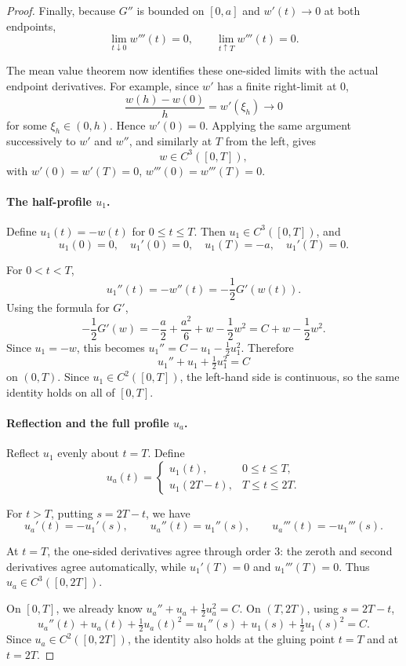 \documentclass{article}
\begin{document}
\begin{proof}
Finally, because $G''$ is bounded on $[0,a]$ and $w'(t) \to 0$ at both endpoints,
\[
\lim_{t \downarrow 0} w'''(t) = 0, \qquad \lim_{t \uparrow T} w'''(t) = 0.
\]

The mean value theorem now identifies these one-sided limits with the actual endpoint derivatives. For example, since $w'$ has a finite right-limit at $0$,
\[
\frac{w(h) - w(0)}{h} = w'(\xi_h) \to 0
\]
for some $\xi_h \in (0,h)$. Hence $w'(0) = 0$. Applying the same argument successively to $w'$ and $w''$, and similarly at $T$ from the left, gives
\[
w \in C^3([0,T]),
\]
with $w'(0) = w'(T) = 0$, $w'''(0) = w'''(T) = 0$.

\paragraph{The half-profile $u_1$.}
Define $u_1(t) = -w(t)$ for $0 \le t \le T$. Then $u_1 \in C^3([0,T])$, and
\[
u_1(0) = 0, \quad u_1'(0) = 0, \quad u_1(T) = -a, \quad u_1'(T) = 0.
\]

For $0 < t < T$,
\[
u_1''(t) = -w''(t) = -\frac{1}{2}G'(w(t)).
\]
Using the formula for $G'$,
\[
-\frac{1}{2}G'(w) = -\frac{a}{2} + \frac{a^2}{6} + w - \frac{1}{2}w^2 = C + w - \frac{1}{2}w^2.
\]
Since $u_1 = -w$, this becomes $u_1'' = C - u_1 - \frac{1}{2}u_1^2$. Therefore
\[
u_1'' + u_1 + \tfrac{1}{2}u_1^2 = C
\]
on $(0,T)$. Since $u_1 \in C^2([0,T])$, the left-hand side is continuous, so the same identity holds on all of $[0,T]$.

\paragraph{Reflection and the full profile $u_a$.}
Reflect $u_1$ evenly about $t = T$. Define
\[
u_a(t) = \begin{cases} u_1(t), & 0 \le t \le T, \\ u_1(2T - t), & T \le t \le 2T. \end{cases}
\]

For $t > T$, putting $s = 2T - t$, we have
\[
u_a'(t) = -u_1'(s), \qquad u_a''(t) = u_1''(s), \qquad u_a'''(t) = -u_1'''(s).
\]

At $t = T$, the one-sided derivatives agree through order 3: the zeroth and second derivatives agree automatically, while $u_1'(T) = 0$ and $u_1'''(T) = 0$. Thus $u_a \in C^3([0,2T])$.

On $[0,T]$, we already know $u_a'' + u_a + \frac{1}{2}u_a^2 = C$. On $(T,2T)$, using $s = 2T - t$,
\[
u_a''(t) + u_a(t) + \tfrac{1}{2}u_a(t)^2 = u_1''(s) + u_1(s) + \tfrac{1}{2}u_1(s)^2 = C.
\]
Since $u_a \in C^2([0,2T])$, the identity also holds at the gluing point $t = T$ and at $t = 2T$.


\end{proof}
\end{document}
